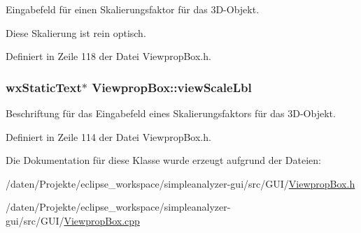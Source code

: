 Eingabefeld für einen Skalierungsfaktor für das 3\-D-\/\-Objekt. 

Diese Skalierung ist rein optisch. 

Definiert in Zeile 118 der Datei Viewprop\-Box.\-h.

\hypertarget{classViewpropBox_ab312348ae97369e3b8a1a7ce8ba9e2b1}{
\subsubsection[{view\-Scale\-Lbl}]{\setlength{\rightskip}{0pt plus 5cm}wx\-Static\-Text$\ast$ Viewprop\-Box\-::view\-Scale\-Lbl\hspace{0.3cm}{\ttfamily [private]}}}\label{classViewpropBox_ab312348ae97369e3b8a1a7ce8ba9e2b1}


Beschriftung für das Eingabefeld eines Skalierungsfaktors für das 3\-D-\/\-Objekt. 



Definiert in Zeile 114 der Datei Viewprop\-Box.\-h.



Die Dokumentation für diese Klasse wurde erzeugt aufgrund der Dateien\-:\begin{DoxyCompactItemize}
\item 
/daten/\-Projekte/eclipse\-\_\-workspace/simpleanalyzer-\/gui/src/\-G\-U\-I/\hyperlink{ViewpropBox_8h}{Viewprop\-Box.\-h}\item 
/daten/\-Projekte/eclipse\-\_\-workspace/simpleanalyzer-\/gui/src/\-G\-U\-I/\hyperlink{ViewpropBox_8cpp}{Viewprop\-Box.\-cpp}\end{DoxyCompactItemize}
